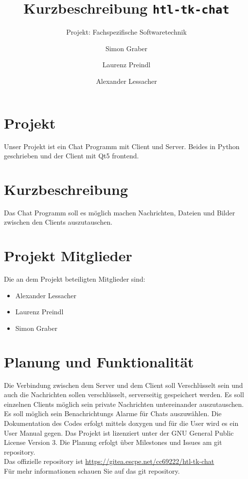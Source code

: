 \documentclass[a4paper,ngerman,headsepline]{scrreprt}
\begin{document}
\title{Kurzbeschreibung \texttt{htl-tk-chat}}
\subtitle{Projekt: Fachspezifische Softwaretechnik}
\author{Simon Graber \and Laurenz Preindl \and Alexander Lessacher}

\maketitle
\section*{Projekt}
Unser Projekt ist ein Chat Programm mit Client und Server. Beides in Python geschrieben und der Client mit Qt5 frontend.

\section*{Kurzbeschreibung}
Das Chat Programm soll es möglich machen Nachrichten, Dateien und Bilder zwischen den Clients auszutauschen.

\section*{Projekt Mitglieder}
Die an dem Projekt beteiligten Mitglieder sind:
\begin{itemize}
 \item Alexander Lessacher
 \item Laurenz Preindl
 \item Simon Graber
\end{itemize}

\section*{Planung und Funktionalität}
Die Verbindung zwischen dem Server und dem Client soll Verschlüsselt sein und auch die Nachrichten sollen verschlüsselt, serverseitig gespeichert werden. Es soll einzelnen Clients möglich sein private Nachrichten untereinander auszutauschen. Es soll möglich sein Benachrichtungs Alarme für Chats auszuwählen. Die Dokumentation des Codes erfolgt mittels doxygen und für die User wird es ein User Manual gegen.
Das Projekt ist lizenziert unter der GNU General Public License Version 3.
Die Planung erfolgt über Milestones und Issues am git repository.\\
Das offizielle repository ist \url{https://gitea.escpe.net/cc69222/htl-tk-chat}\\
Für mehr informationen schauen Sie auf das git repository.
\end{document}
